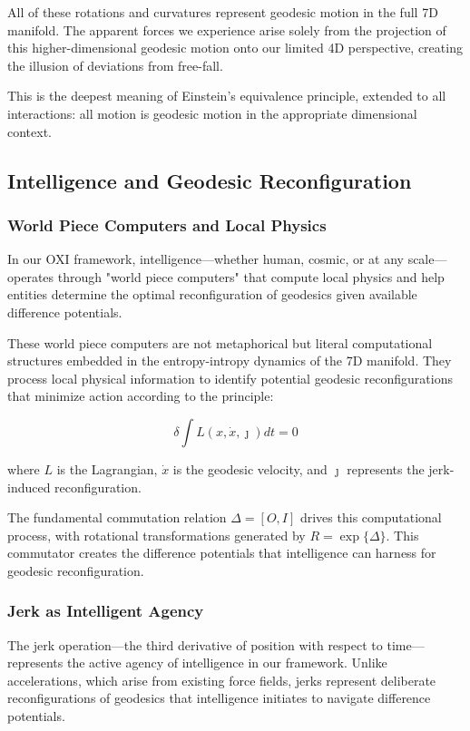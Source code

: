 \documentclass{article}
\begin{document}
All of these rotations and curvatures represent geodesic motion in the full 7D manifold. The apparent forces we experience arise solely from the projection of this higher-dimensional geodesic motion onto our limited 4D perspective, creating the illusion of deviations from free-fall.

This is the deepest meaning of Einstein's equivalence principle, extended to all interactions: all motion is geodesic motion in the appropriate dimensional context.

\subsection{Intelligence and Geodesic Reconfiguration}

\subsubsection{World Piece Computers and Local Physics}

In our OXI framework, intelligence—whether human, cosmic, or at any scale—operates through "world piece computers" that compute local physics and help entities determine the optimal reconfiguration of geodesics given available difference potentials.

These world piece computers are not metaphorical but literal computational structures embedded in the entropy-intropy dynamics of the 7D manifold. They process local physical information to identify potential geodesic reconfigurations that minimize action according to the principle:

\begin{equation}
\delta \int L(x, \dot{x}, \jmath) dt = 0
\end{equation}

where $L$ is the Lagrangian, $\dot{x}$ is the geodesic velocity, and $\jmath$ represents the jerk-induced reconfiguration.

The fundamental commutation relation $\Delta = [O, I]$ drives this computational process, with rotational transformations generated by $R = \exp\{\Delta\}$. This commutator creates the difference potentials that intelligence can harness for geodesic reconfiguration.

\subsubsection{Jerk as Intelligent Agency}

The jerk operation—the third derivative of position with respect to time—represents the active agency of intelligence in our framework. Unlike accelerations, which arise from existing force fields, jerks represent deliberate reconfigurations of geodesics that intelligence initiates to navigate difference potentials.
\end{document}
